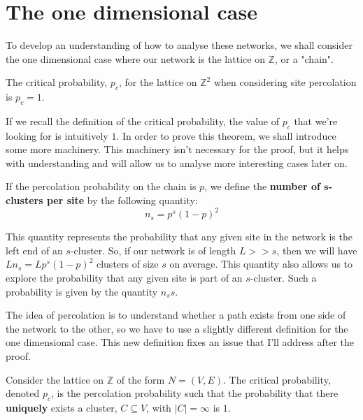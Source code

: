 \section{The one dimensional case}
To develop an understanding of how to analyse these networks, we shall consider the one dimensional case where our network is the lattice on $\mathbb{Z}$, or a "chain". %

\begin{theorem}\label{thm:critical probability z1 site percolation}
  The critical probability, $p_c$, for the lattice on $\mathbb{Z}^2$ when considering site percolation is $p_c = 1$.
\end{theorem}

If we recall the definition of the critical probability, the value of $p_c$ that we're looking for is intuitively $1$. In order to prove this theorem, we shall introduce some more
machinery. This machinery isn't necessary for the proof, but it helps with understanding and will allow us to analyse more interesting cases later on.

\begin{definition}\label{def:s-clusters per site}
  If the percolation probability on the chain is $p$, we define the \textbf{number of $\mathbf{s}$-clusters per site} by the following quantity:
  $$n_s = p^s(1-p)^2$$
\end{definition}

This quantity represents the probability that any given site in the network is the left end of an $s$-cluster. So, if our network is of length $L >> s$, then we will have
$Ln_s=Lp^s(1-p)^2$ clusters of size $s$ on average. This quantity also allows us to explore the probability that any given site is part of an $s$-cluster. Such a probability is
given by the quantity $n_ss$.

The idea of percolation is to understand whether a path exists from one side of the network to the other, so we have to use a slightly different definition for the one dimensional
case. This new definition fixes an issue that I'll address after the proof.

\begin{definition}\label{def:critical probability special case}
  Consider the lattice on $\mathbb{Z}$ of the form $N = (V, E)$. The critical probability, denoted $p_c$, is the percolation probability such that the probability that there
  \textbf{uniquely} exists a cluster, $C
  \subseteq V$, with $|C| = \infty$ is $1$.
\end{definition}

